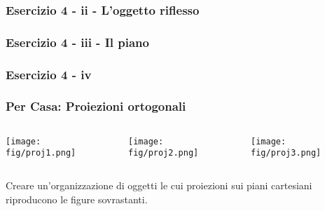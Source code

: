 \documentclass{beamer}
\newcommand{\fig}{figures}
\begin{document}
\begin{frame}
\frametitle{Esercizio 4 - ii - L'oggetto riflesso}
\begin{center}
\end{center}
\end{frame}
\begin{frame}
\frametitle{Esercizio 4 - iii - Il piano}
\begin{center}
\end{center}
\end{frame}
\begin{frame}
\frametitle{Esercizio 4 - iv}
\begin{center}
\end{center}
\end{frame}

\begin{frame}
\frametitle{Per Casa: Proiezioni ortogonali}
\begin{columns}
\begin{column}{0.32\textwidth}
\texttt{[image: \\fig/proj1.png]}
\end{column}
\begin{column}{0.32\textwidth}
\texttt{[image: \\fig/proj2.png]}
\end{column}
\begin{column}{0.32\textwidth}
\texttt{[image: \\fig/proj3.png]}
\end{column}
\end{columns}
\vspace{20pt}
Creare un'organizzazione di oggetti le cui proiezioni sui piani cartesiani riproducono le figure sovrastanti.
\end{frame}
\end{document}
